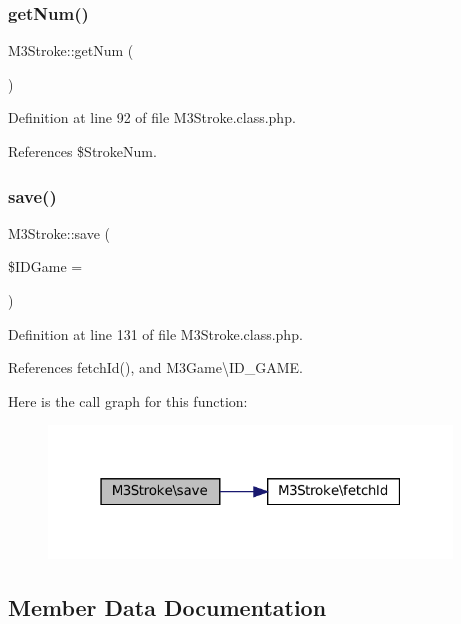 \subsubsection{\texorpdfstring{get\+Num()}{getNum()}}
{\footnotesize\ttfamily M3\+Stroke\+::get\+Num (\begin{DoxyParamCaption}{ }\end{DoxyParamCaption})}



Definition at line 92 of file M3\+Stroke.\+class.\+php.



References \$\+Stroke\+Num.

\mbox{\label{class_m3_stroke_a3539e375dbcdb90b0ffd2a666b9463a7}} 
\subsubsection{\texorpdfstring{save()}{save()}}
{\footnotesize\ttfamily M3\+Stroke\+::save (\begin{DoxyParamCaption}\item[{}]{\$\+I\+D\+Game = {} }\end{DoxyParamCaption})}



Definition at line 131 of file M3\+Stroke.\+class.\+php.



References fetch\+Id(), and M3\+Game\textbackslash{}\+I\+D\+\_\+\+G\+A\+ME.

Here is the call graph for this function\+:\nopagebreak
\begin{figure}[H]
\begin{center}
\leavevmode
\includegraphics[width=304pt]{class_m3_stroke_a3539e375dbcdb90b0ffd2a666b9463a7_cgraph}
\end{center}
\end{figure}


\subsection{Member Data Documentation}
\mbox{\label{class_m3_stroke_a04ed9992b36359efc4a199525e58e13f}} 
